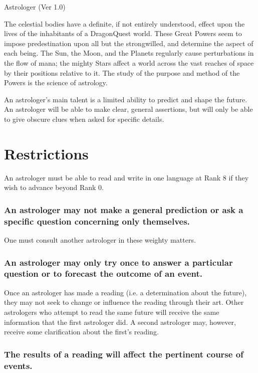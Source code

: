 \begin{Chapter}{Astrologer (Ver 1.0)}

The celestial bodies have a definite, if not entirely understood,
effect upon the lives of the inhabitants of a DragonQuest world. These
Great Powers seem to impose predestination upon all but the
strongwilled, and determine the aspect of each being. The Sun, the
Moon, and the Planets regularly cause perturbations in the flow of
mana; the mighty Stars affect a world across the vast reaches of space
by their positions relative to it.  The study of the purpose and
method of the Powers is the science of astrology.

An astrologer’s main talent is a limited ability to predict and shape
the future. An astrologer will be able to make clear, general
assertions, but will only be able to give obscure clues when asked for
specific details.

\section{Restrictions}

An astrologer must be able to read and write in one language at Rank 8
if they wish to advance beyond Rank 0.

\subsubsection{An astrologer may not make a general prediction or ask a specific
question concerning only themselves.}

One must consult another astrologer in these weighty matters.

\subsubsection{An astrologer may only try once to answer a particular question or to
forecast the outcome of an event.}

Once an astrologer has made a reading (i.e. a determination about the
future), they may not seek to change or influence the reading through
their art.  Other astrologers who attempt to read the same future will
receive the same information that the first astrologer did. A second
astrologer may, however, receive some clarification about the
first’s reading.

\subsubsection{The results of a reading will affect the pertinent course of events.}


\end{Chapter}
